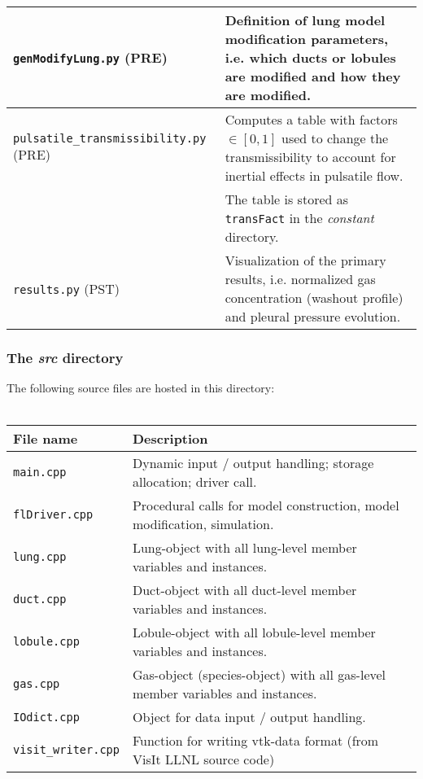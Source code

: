\begin{tabular}{L{0.4\textwidth} L{0.6\textwidth}}
  \midrule
  \texttt{genModifyLung.py} (PRE)   & Definition of lung model modification parameters, i.e. which ducts or lobules are modified and how they are modified. \\
  \midrule
  \texttt{pulsatile\_transmissibility.py} (PRE) & Computes a table with factors $\in[0,1]$ used to change the transmissibility to account for inertial effects in pulsatile flow. \\
                                         & The table is stored as \texttt{transFact} in the \textit{constant} directory. \\
  \midrule
  \texttt{results.py} (PST)              & Visualization of the primary results, i.e. normalized gas concentration (washout profile) and pleural pressure evolution. \\
  \bottomrule
\end{tabular}

\subsubsection{The \textit{src} directory}
The following source files are hosted in this directory:
\\ \\
\begin{tabular}{L{0.25\textwidth} L{0.75\textwidth}}
  \toprule
  File name          & Description \\
  \midrule
  \texttt{main.cpp}           & Dynamic input / output handling; storage allocation; driver call. \\
  \midrule
  \texttt{flDriver.cpp}       & Procedural calls for model construction, model modification, simulation. \\
  \midrule
  \texttt{lung.cpp}           & Lung-object with all lung-level member variables and instances. \\
  \midrule
  \texttt{duct.cpp}           & Duct-object with all duct-level member variables and instances. \\
  \midrule
  \texttt{lobule.cpp}         & Lobule-object with all lobule-level member variables and instances. \\
  \midrule
  \texttt{gas.cpp}            & Gas-object (species-object) with all gas-level member variables and instances. \\
  \midrule
  \texttt{IOdict.cpp}         & Object for data input / output handling. \\
  \midrule
  \texttt{visit\_writer.cpp}  & Function for writing vtk-data format (from VisIt LLNL source code) \\
  \bottomrule
\end{tabular}



